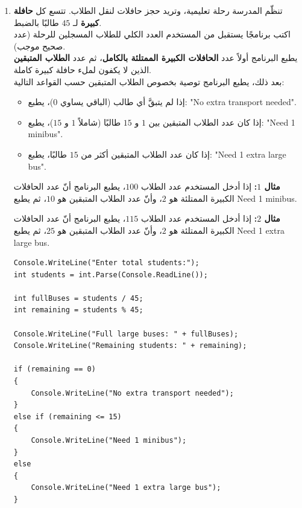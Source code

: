 \documentclass[14pt]{extarticle}
\begin{document}
\begin{enumerate}[resume, itemsep=2.2em]

\item
تنظّم المدرسة رحلة تعليمية، وتريد حجز حافلات لنقل الطلاب. تتسع كل \textbf{حافلة كبيرة} لـ $45$ طالبًا بالضبط. \\
اكتب برنامجًا يستقبل من المستخدم العدد الكلي للطلاب المسجلين للرحلة (عدد صحيح موجب). \\
يطبع البرنامج أولاً عدد \textbf{الحافلات الكبيرة الممتلئة بالكامل}، ثم عدد \textbf{الطلاب المتبقين} الذين لا يكفون لملء حافلة كبيرة كاملة. \\
بعد ذلك، يطبع البرنامج توصية بخصوص الطلاب المتبقين حسب القواعد التالية:
\begin{itemize}[nosep]
    \item إذا لم يتبقَّ أي طالب (الباقي يساوي $0$)، يطبع: \textenglish{"No extra transport needed"}.
    \item إذا كان عدد الطلاب المتبقين بين $1$ و $15$ طالبًا (شاملاً $1$ و $15$)، يطبع: \textenglish{"Need 1 minibus"}.
    \item إذا كان عدد الطلاب المتبقين أكثر من $15$ طالبًا، يطبع: \textenglish{"Need 1 extra large bus"}.
\end{itemize}

\textbf{مثال $1$:} إذا أدخل المستخدم عدد الطلاب $100$، يطبع البرنامج أنّ عدد الحافلات الكبيرة الممتلئة هو $2$، وأنّ عدد الطلاب المتبقين هو $10$، ثم يطبع \textenglish{Need 1 minibus}.

\textbf{مثال $2$:} إذا أدخل المستخدم عدد الطلاب $115$، يطبع البرنامج أنّ عدد الحافلات الكبيرة الممتلئة هو $2$، وأنّ عدد الطلاب المتبقين هو $25$، ثم يطبع \textenglish{Need 1 extra large bus}.

\ifwithsols
\begin{boxSolution}
\begin{english}
\begin{verbatim}
Console.WriteLine("Enter total students:");
int students = int.Parse(Console.ReadLine());

int fullBuses = students / 45;
int remaining = students % 45;

Console.WriteLine("Full large buses: " + fullBuses);
Console.WriteLine("Remaining students: " + remaining);

if (remaining == 0)
{
    Console.WriteLine("No extra transport needed");
}
else if (remaining <= 15)
{
    Console.WriteLine("Need 1 minibus");
}
else
{
    Console.WriteLine("Need 1 extra large bus");
}
\end{verbatim}
\end{english}
\end{boxSolution}
\fi
\filbreak


\end{enumerate}
\end{document}
